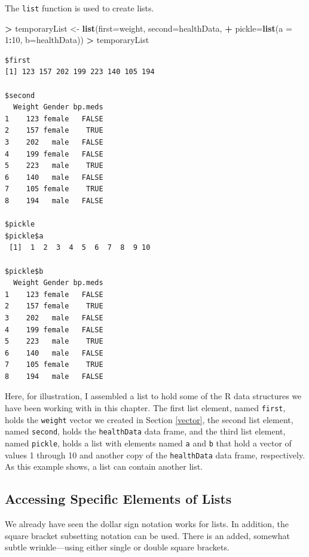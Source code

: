 \documentclass[]{krantz}
\makeatletter
\newenvironment{Shaded}{\begin{snugshade}}{\end{snugshade}}
\newcommand{\KeywordTok}[1]{\textcolor[rgb]{0.27,0.27,0.27}{\textbf{#1}}}
\newcommand{\DataTypeTok}[1]{\textcolor[rgb]{0.27,0.27,0.27}{#1}}
\newcommand{\DecValTok}[1]{\textcolor[rgb]{0.06,0.06,0.06}{#1}}
\newcommand{\StringTok}[1]{\textcolor[rgb]{0.5,0.5,0.5}{#1}}
\newcommand{\OperatorTok}[1]{\textcolor[rgb]{0.43,0.43,0.43}{\textbf{#1}}}
\newcommand{\NormalTok}[1]{#1}
\newenvironment{kframe}{%
\medskip{}
\setlength{\fboxsep}{.8em}
 \def\at@end@of@kframe{}%
 \ifinner\ifhmode%
  \def\at@end@of@kframe{\end{minipage}}%
  \begin{minipage}{\columnwidth}%
 \fi\fi%
 \def\FrameCommand##1{\hskip\@totalleftmargin \hskip-\fboxsep
 \colorbox{shadecolor}{##1}\hskip-\fboxsep
     \hskip-\linewidth \hskip-\@totalleftmargin \hskip\columnwidth}%
 \MakeFramed {\advance\hsize-\width
   \@totalleftmargin\z@ \linewidth\hsize
   \@setminipage}}%
 {\par\unskip\endMakeFramed%
 \at@end@of@kframe}
\renewenvironment{Shaded}{\begin{kframe}}{\end{kframe}}
\makeatother
\begin{document}
The \texttt{list} function is used to create lists.

\begin{Shaded}
\begin{Highlighting}[]
\OperatorTok{>}\StringTok{ }\NormalTok{temporaryList <-}\StringTok{ }\KeywordTok{list}\NormalTok{(}\DataTypeTok{first=}\NormalTok{weight, }\DataTypeTok{second=}\NormalTok{healthData,}
\OperatorTok{+}\StringTok{                       }\DataTypeTok{pickle=}\KeywordTok{list}\NormalTok{(}\DataTypeTok{a =} \DecValTok{1}\OperatorTok{:}\DecValTok{10}\NormalTok{, }\DataTypeTok{b=}\NormalTok{healthData))}
\OperatorTok{>}\StringTok{ }\NormalTok{temporaryList}
\end{Highlighting}
\end{Shaded}

\begin{verbatim}
$first
[1] 123 157 202 199 223 140 105 194

$second
  Weight Gender bp.meds
1    123 female   FALSE
2    157 female    TRUE
3    202   male   FALSE
4    199 female   FALSE
5    223   male    TRUE
6    140   male   FALSE
7    105 female    TRUE
8    194   male   FALSE

$pickle
$pickle$a
 [1]  1  2  3  4  5  6  7  8  9 10

$pickle$b
  Weight Gender bp.meds
1    123 female   FALSE
2    157 female    TRUE
3    202   male   FALSE
4    199 female   FALSE
5    223   male    TRUE
6    140   male   FALSE
7    105 female    TRUE
8    194   male   FALSE
\end{verbatim}

Here, for illustration, I assembled a list to hold some of the R data
structures we have been working with in this chapter. The first list
element, named \texttt{first}, holds the \texttt{weight} vector we
created in Section \ref{vector}, the second list element, named
\texttt{second}, holds the \texttt{healthData} data frame, and the third
list element, named \texttt{pickle}, holds a list with elements named
\texttt{a} and \texttt{b} that hold a vector of values 1 through 10 and
another copy of the \texttt{healthData} data frame, respectively. As
this example shows, a list can contain another list.

\subsection{Accessing Specific Elements of
Lists}\label{accessing-specific-elements-of-lists}

We already have seen the dollar sign notation works for lists. In
addition, the square bracket subsetting notation can be used. There is
an added, somewhat subtle wrinkle---using either single or double square
brackets.
\end{document}
